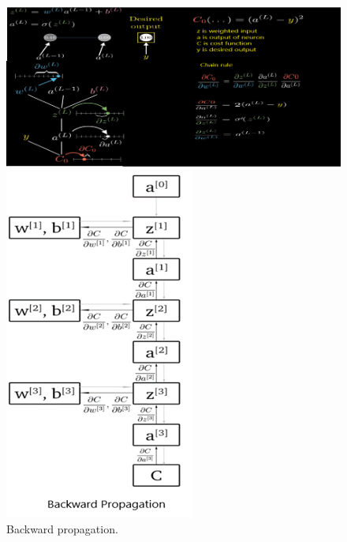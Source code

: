 \documentclass{article}
\begin{document}
\begin{figure}[H]
  \centering
  \begin{minipage}[b]{0.8\textwidth}
    \includegraphics[width=\textwidth]{img/backprop.png}
    \caption{Backward propagation.\protect\cite{DL}}
    \label{back}
  \end{minipage}
  \hfill
  \begin{minipage}[b]{0.3\textwidth}
    \includegraphics[width=\textwidth]{img/backprop2.png}

\end{minipage}
\end{figure}
\end{document}
